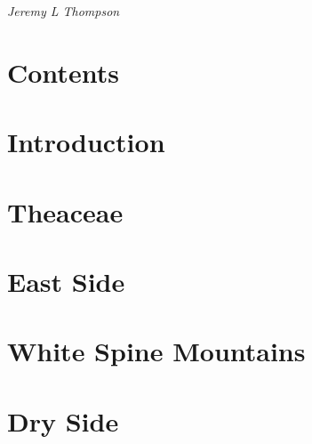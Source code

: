 \documentclass[twoside, openany]{book}
\begin{document}
\begin{titlepage}
\centering

~\\
\vspace{5cm}
\\
\vspace{2cm}
{\Large\itshape Jeremy L Thompson}

\end{titlepage}
\thispagestyle{empty}

\chapter*{Contents}

\begin{multicols}{2}
\makeatletter
\large{
}
\makeatother
\end{multicols}

\chapter*{Introduction}



\chapter{Theaceae}



\chapter{East Side}



\chapter{White Spine Mountains}



\chapter{Dry Side}


\end{document}
